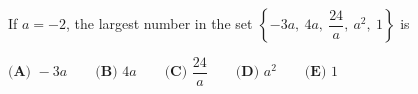 If $a=-2$, the largest number in the set $\left\{-3a,\ 4a,\ \dfrac{24}{a},\ a^2,\ 1\right\}$ is

$\textbf{(A) }-3a\qquad\textbf{(B) }4a\qquad\textbf{(C) }\dfrac{24}{a}\qquad\textbf{(D) }a^2\qquad\textbf{(E) }1$
